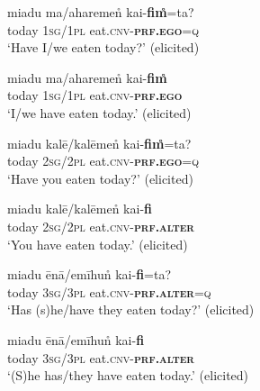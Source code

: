 \documentclass[output=paper]{langsci/langscibook}
\begin{document}
\begin{exe}
	\ex 	\label{ex:jl1}
	\gll miadu ma/aharemen̊ kai-\textbf{fim̊}=ta?\\
	today \textsc{1sg}/\textsc{1pl} eat.\textsc{cnv}-\textbf{\textsc{prf}.\textsc{ego}}=\textsc{q}\\
	\trans ‘Have I/we eaten today?’ (elicited)
\end{exe}

\begin{exe}
	\ex 	\label{ex:jl2}
	\gll miadu ma/aharemen̊ kai-\textbf{fim̊}\\
	today \textsc{1sg}/\textsc{1pl} eat.\textsc{cnv}-\textbf{\textsc{prf}.\textsc{ego}}\\
	\trans ‘I/we have eaten today.’ (elicited)
\end{exe}

\begin{exe}
	\ex 	\label{ex:jl3}
	\gll miadu kalē/kalēmen̊ kai-\textbf{fim̊}=ta?\\
	today \textsc{2sg}/\textsc{2pl} eat.\textsc{cnv}-\textbf{\textsc{prf}.\textsc{ego}}=\textsc{q}\\
	\trans ‘Have you eaten today?’ (elicited)
\end{exe}

\begin{exe}
	\ex 	\label{ex:jl4}
	\gll miadu kalē/kalēmen̊ kai-\textbf{fi}\\
	today \textsc{2sg}/\textsc{2pl} eat.\textsc{cnv}-\textbf{\textsc{prf}.\textsc{alter}}\\
	\trans ‘You have eaten today.’ (elicited)
\end{exe}

\begin{exe}
	\ex 	\label{ex:jl5}
	\gll miadu ēnā/emīhun̊ kai-\textbf{fi}=ta?\\
	today \textsc{3sg}/\textsc{3pl} eat.\textsc{cnv}-\textbf{\textsc{prf}.\textsc{alter}}=\textsc{q}\\
	\trans ‘Has (s)he/have they eaten today?’ (elicited)
\end{exe}

\begin{exe}
	\ex 	\label{ex:jl6}
	\gll miadu ēnā/emīhun̊ kai-\textbf{fi}\\
	today \textsc{3sg}/\textsc{3pl} eat.\textsc{cnv}-\textbf{\textsc{prf}.\textsc{alter}}\\
	\trans ‘(S)he has/they have eaten today.’ (elicited)
\end{exe}
\end{document}
